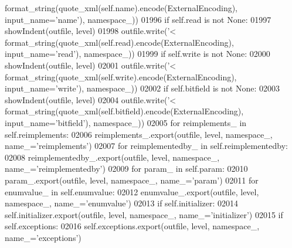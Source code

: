 \begin{DoxyCode}
{{{{{{{{{{{{{{{{{{{{{{{{{{{{{{{{{{{{{{{{{{{{{{{{{{{{{{{{{{{{{{{{{{{{{{{{{{{{{{{{{{{{{{{{{{{{{{{{{{{{{{{{{{{{{{{{{{{{{{{{{{{{{{{{{{{{{{{{{{{{      format_string(quote_xml(self.name).encode(ExternalEncoding), input\_name=\textcolor{stringliteral}{'name'}), namespace\_))
01996         \textcolor{keywordflow}{if} self.read \textcolor{keywordflow}{is} \textcolor{keywordflow}{not} \textcolor{keywordtype}{None}:
01997             showIndent(outfile, level)
01998             outfile.write(\textcolor{stringliteral}{'<%
      format_string(quote_xml(self.read).encode(ExternalEncoding), input\_name=\textcolor{stringliteral}{'read'}), namespace\_))
01999         \textcolor{keywordflow}{if} self.write \textcolor{keywordflow}{is} \textcolor{keywordflow}{not} \textcolor{keywordtype}{None}:
02000             showIndent(outfile, level)
02001             outfile.write(\textcolor{stringliteral}{'<%
      format_string(quote_xml(self.write).encode(ExternalEncoding), input\_name=\textcolor{stringliteral}{'write'}), namespace\_))
02002         \textcolor{keywordflow}{if} self.bitfield \textcolor{keywordflow}{is} \textcolor{keywordflow}{not} \textcolor{keywordtype}{None}:
02003             showIndent(outfile, level)
02004             outfile.write(\textcolor{stringliteral}{'<%
      format_string(quote_xml(self.bitfield).encode(ExternalEncoding), input\_name=\textcolor{stringliteral}{'bitfield'}), namespace\_))
02005         \textcolor{keywordflow}{for} reimplements\_ \textcolor{keywordflow}{in} self.reimplements:
02006             reimplements\_.export(outfile, level, namespace\_, name\_=\textcolor{stringliteral}{'reimplements'})
02007         \textcolor{keywordflow}{for} reimplementedby\_ \textcolor{keywordflow}{in} self.reimplementedby:
02008             reimplementedby\_.export(outfile, level, namespace\_, name\_=\textcolor{stringliteral}{'reimplementedby'})
02009         \textcolor{keywordflow}{for} param\_ \textcolor{keywordflow}{in} self.param:
02010             param\_.export(outfile, level, namespace\_, name\_=\textcolor{stringliteral}{'param'})
02011         \textcolor{keywordflow}{for} enumvalue\_ \textcolor{keywordflow}{in} self.enumvalue:
02012             enumvalue\_.export(outfile, level, namespace\_, name\_=\textcolor{stringliteral}{'enumvalue'})
02013         \textcolor{keywordflow}{if} self.initializer:
02014             self.initializer.export(outfile, level, namespace\_, name\_=\textcolor{stringliteral}{'initializer'})
02015         \textcolor{keywordflow}{if} self.exceptions:
02016             self.exceptions.export(outfile, level, namespace\_, name\_=\textcolor{stringliteral}{'exceptions'})
}}}}}}}}}}}}}}}}}}}}}}}}}}}}}}}}}}}}}}}}}}}}}}}}}}}}}}}}}}}}}}}}}}}}}}}}}}}}}}}}}}}}}}}}}}}}}}}}}}}}}}}}}}}}}}}}}}}}}}}}}}}}}}}}}}}}}}}}}}}}}}}
\end{DoxyCode}
